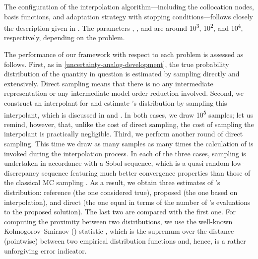 The configuration of the interpolation algorithm---including the collocation
nodes, basis functions, and adaptation strategy with stopping
conditions---follows closely the description given in
. The parameters , , and
 are around 10\textsuperscript{3}, 10\textsuperscript{2}, and
10\textsuperscript{4}, respectively, depending on the problem.

The performance of our framework with respect to each problem is assessed as
follows. First, as in \cref{uncertainty-analog-development}, the true
probability distribution of the quantity in question \g is estimated by sampling
\g directly and extensively. Direct sampling means that there is no any
intermediate representation or any intermediate model order reduction involved.
Second, we construct an interpolant for \g and estimate \g's distribution by
sampling this interpolant, which is discussed in 
and . In both cases, we draw 10\textsuperscript{5}
samples; let us remind, however, that, unlike the cost of direct sampling, the
cost of sampling the interpolant is practically negligible. Third, we perform
another round of direct sampling. This time we draw as many samples as many
times the calculation of \g is invoked during the interpolation process. In each
of the three cases, sampling is undertaken in accordance with a Sobol sequence,
which is a quasi-random low-discrepancy sequence featuring much better
convergence properties than those of the classical \ac{MC} sampling
\cite{joe2008}. As a result, we obtain three estimates of \g's distribution:
reference (the one considered true), proposed (the one based on interpolation),
and direct (the one equal in terms of the number of \g's evaluations to the
proposed solution). The last two are compared with the first one. For computing
the proximity between two distributions, we use the well-known
Kolmogorov--Smirnov () statistic \cite{rao2002}, which is the supremum
over the distance (pointwise) between two empirical distribution functions and,
hence, is a rather unforgiving error indicator.

